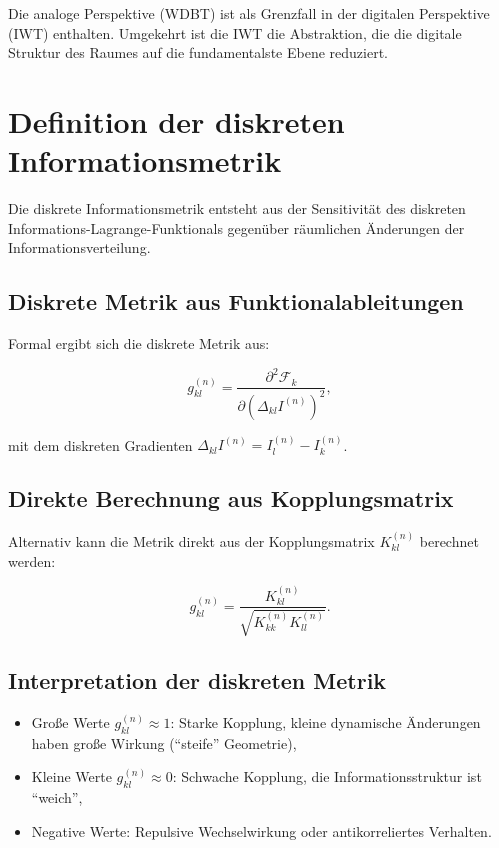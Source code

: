Die analoge Perspektive (WDBT) ist als Grenzfall in der digitalen Perspektive (IWT) enthalten. Umgekehrt ist die IWT die Abstraktion, die die digitale Struktur des Raumes auf die fundamentalste Ebene reduziert.

\section{Definition der diskreten Informationsmetrik}
\label{sec:metrik_definition}

Die diskrete Informationsmetrik entsteht aus der Sensitivität des diskreten Informations-Lagrange-Funktionals gegenüber räumlichen Änderungen der Informationsverteilung.

\subsection{Diskrete Metrik aus Funktionalableitungen}
\label{sub:metrik_funktional}

Formal ergibt sich die diskrete Metrik aus:

\[
g_{kl}^{(n)} = \frac{\partial^2 \mathcal{F}_k}{\partial (\Delta_{kl} I^{(n)})^2},
\]

mit dem diskreten Gradienten \( \Delta_{kl} I^{(n)} = I_l^{(n)} - I_k^{(n)} \).

\subsection{Direkte Berechnung aus Kopplungsmatrix}
\label{sub:metrik_kopplung}

Alternativ kann die Metrik direkt aus der Kopplungsmatrix \( K_{kl}^{(n)} \) berechnet werden:

\[
g_{kl}^{(n)} = \frac{K_{kl}^{(n)}}{\sqrt{K_{kk}^{(n)} K_{ll}^{(n)}}}.
\]

\subsection{Interpretation der diskreten Metrik}
\label{sub:metrik_interpretation}

\begin{itemize}
    \item Große Werte \( g_{kl}^{(n)} \approx 1 \): Starke Kopplung, kleine dynamische Änderungen haben große Wirkung (\enquote{steife} Geometrie),
    \item Kleine Werte \( g_{kl}^{(n)} \approx 0 \): Schwache Kopplung, die Informationsstruktur ist \enquote{weich},
    \item Negative Werte: Repulsive Wechselwirkung oder antikorreliertes Verhalten.
\end{itemize}

